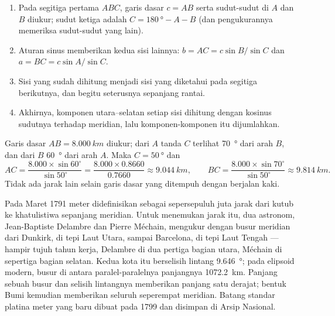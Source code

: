 \begin{method}\label{met:g10:measuring-the-earth:chain}
\begin{enumerate}
  \item Pada segitiga pertama $ABC$, garis dasar $c = AB$ serta sudut-sudut di
        $A$ dan $B$ diukur; sudut ketiga adalah
        $C = \qty{180}{\degree} - A - B$ (dan pengukurannya memeriksa
        sudut-sudut yang lain).
  \item Aturan sinus memberikan kedua sisi lainnya:
        $b = AC = c \sin B / \sin C$ dan $a = BC = c \sin A / \sin C$.
  \item Sisi yang sudah dihitung menjadi sisi yang diketahui pada segitiga
        berikutnya, dan begitu seterusnya sepanjang rantai.
  \item Akhirnya, komponen utara--selatan setiap sisi dihitung dengan kosinus
        sudutnya terhadap meridian, lalu komponen-komponen itu dijumlahkan.
\end{enumerate}
\end{method}

\begin{example}\label{ex:g10:measuring-the-earth:triangle}
Garis dasar $AB = \qty{8.000}{km}$ diukur; dari $A$ tanda $C$ terlihat
\qty{70}{\degree} dari arah $B$, dan dari $B$ \qty{60}{\degree} dari arah
$A$. Maka $C = \qty{50}{\degree}$ dan
\[
  AC = \frac{8.000 \times \sin 60^\circ}{\sin 50^\circ} = \frac{8.000 \times 0.8660}{0.7660}
  \approx \qty{9.044}{km}, \qquad
  BC = \frac{8.000 \times \sin 70^\circ}{\sin 50^\circ} \approx \qty{9.814}{km}.
\]
Tidak ada jarak lain selain garis dasar yang ditempuh dengan berjalan kaki.
\end{example}

\begin{example}\label{ex:g10:measuring-the-earth:meridian}
Pada Maret 1791 meter didefinisikan sebagai sepersepuluh juta jarak dari kutub
ke khatulistiwa sepanjang meridian. Untuk menemukan jarak itu, dua astronom,
Jean-Baptiste Delambre dan Pierre Méchain, mengukur dengan  busur
meridian dari Dunkirk, di tepi Laut Utara, sampai Barcelona, di tepi Laut
Tengah --- hampir tujuh tahun kerja, Delambre di dua pertiga bagian utara,
Méchain di sepertiga bagian selatan. Kedua kota itu berselisih lintang
\qty{9.646}{\degree}; pada elipsoid modern, busur di antara paralel-paralelnya
panjangnya \qty{1072.2}{km}. Panjang sebuah busur dan selisih lintangnya
memberikan panjang satu derajat; bentuk Bumi kemudian memberikan seluruh
seperempat meridian. Batang standar platina meter yang baru dibuat pada 1799
dan disimpan di Arsip Nasional.
\end{example}

